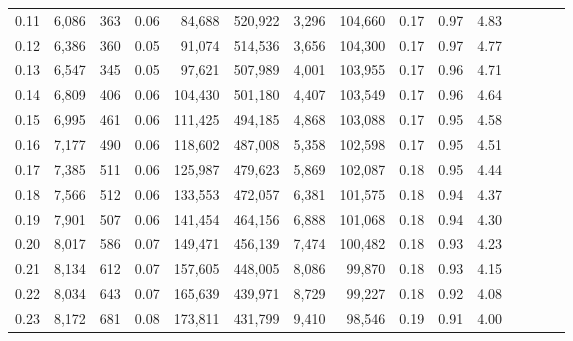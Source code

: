 \begin{tabular}{rrrcrrrrrrrrrrr}
0.11 &   6,086 &    363 &                                       0.06 &   84,688 &  520,922 &    3,296 &  104,660 &  0.17 &  0.97 &                         4.83 \\
0.12 &   6,386 &    360 &                                       0.05 &   91,074 &  514,536 &    3,656 &  104,300 &  0.17 &  0.97 &                         4.77 \\
0.13 &   6,547 &    345 &                                       0.05 &   97,621 &  507,989 &    4,001 &  103,955 &  0.17 &  0.96 &                         4.71 \\
0.14 &   6,809 &    406 &                                       0.06 &  104,430 &  501,180 &    4,407 &  103,549 &  0.17 &  0.96 &                         4.64 \\
0.15 &   6,995 &    461 &                                       0.06 &  111,425 &  494,185 &    4,868 &  103,088 &  0.17 &  0.95 &                         4.58 \\
0.16 &   7,177 &    490 &                                       0.06 &  118,602 &  487,008 &    5,358 &  102,598 &  0.17 &  0.95 &                         4.51 \\
0.17 &   7,385 &    511 &                                       0.06 &  125,987 &  479,623 &    5,869 &  102,087 &  0.18 &  0.95 &                         4.44 \\
0.18 &   7,566 &    512 &                                       0.06 &  133,553 &  472,057 &    6,381 &  101,575 &  0.18 &  0.94 &                         4.37 \\
0.19 &   7,901 &    507 &                                       0.06 &  141,454 &  464,156 &    6,888 &  101,068 &  0.18 &  0.94 &                         4.30 \\
0.20 &   8,017 &    586 &                                       0.07 &  149,471 &  456,139 &    7,474 &  100,482 &  0.18 &  0.93 &                         4.23 \\
0.21 &   8,134 &    612 &                                       0.07 &  157,605 &  448,005 &    8,086 &   99,870 &  0.18 &  0.93 &                         4.15 \\
0.22 &   8,034 &    643 &                                       0.07 &  165,639 &  439,971 &    8,729 &   99,227 &  0.18 &  0.92 &                         4.08 \\
0.23 &   8,172 &    681 &                                       0.08 &  173,811 &  431,799 &    9,410 &   98,546 &  0.19 &  0.91 &                         4.00 \\

\end{tabular}
